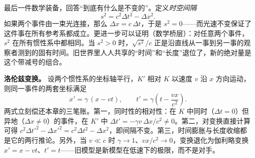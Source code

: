 \begin{mainline}
最后一件数学装备，回答“到底有什么是不变的”。定义\emph{时空间隔}
\[
s^{2}=c^{2}\Delta t^{2}-\Delta x^{2}.
\]
如果两个事件由一束光连接，那么 \(\Delta x=c\,\Delta t\)，于是 \(s^{2}=0\)——而光速不变保证了这件事在所有参考系都成立。更进一步可以证明（数学桥层）：对任意两个事件，\(s^{2}\) 在所有惯性系中都相同。当 \(s^{2}>0\) 时，\(\sqrt{s^{2}}/c\) 正是沿直线从一事到另一事的观察者测到的固有时间。旧世界里人人共享的“时间”和“长度”退位了，新的绝对量是这个带减号的组合。
\end{mainline}

\begin{mathbridge}
\textbf{洛伦兹变换。} 设两个惯性系的坐标轴平行，\(K'\) 相对 \(K\) 以速度 \(v\) 沿 \(x\) 方向运动，则同一事件的两套坐标满足
\[
x'=\gamma\,(x-vt),\qquad
t'=\gamma\left(t-\frac{vx}{c^{2}}\right).
\]
两式立刻偿还本章的三笔账。第一，同时性的相对性：在 \(K\) 中同时（\(\Delta t=0\)）但异地（\(\Delta x\neq 0\)）的事件，在 \(K'\) 中 \(\Delta t'=-\gamma v\,\Delta x/c^{2}\neq 0\)。第二，对变换直接计算可得 \(c^{2}\Delta t'^{2}-\Delta x'^{2}=c^{2}\Delta t^{2}-\Delta x^{2}\)，即间隔不变。第三，时间膨胀与长度收缩都是它的两行推论。另外，当 \(v\ll c\) 时 \(\gamma\to 1\)、\(vx/c^{2}\to 0\)，变换退化为伽利略变换 \(x'=x-vt\)、\(t'=t\)——旧模型是新模型在低速下的极限，而不是对手。
\end{mathbridge}


